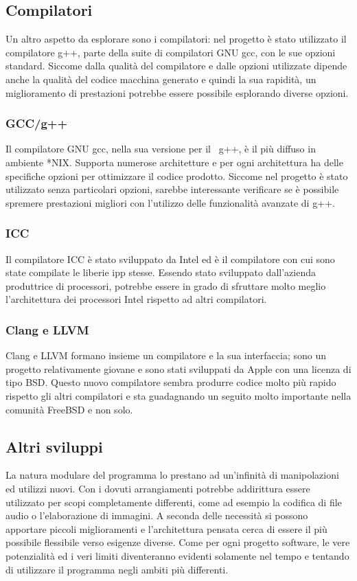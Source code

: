 \subsection{Compilatori}
Un altro aspetto da esplorare sono i compilatori: nel progetto \`e stato
utilizzato il compilatore g++, parte della suite di compilatori GNU gcc, con le
sue opzioni standard. Siccome dalla qualit\`a del compilatore e dalle opzioni
utilizzate dipende anche la qualit\`a del codice macchina generato e quindi la
sua rapidit\`a, un miglioramento di prestazioni potrebbe essere possibile
esplorando diverse opzioni.

\subsubsection{GCC/g++}
Il compilatore GNU gcc, nella sua versione per il \CC\, g++, \`e il pi\`u
diffuso in ambiente *NIX. Supporta numerose architetture e per ogni architettura
ha delle specifiche opzioni per ottimizzare il codice prodotto. Siccome nel
progetto \`e stato utilizzato senza particolari opzioni, sarebbe interessante
verificare se \`e possibile spremere prestazioni migliori con l'utilizzo delle
funzionalit\`a avanzate di g++.

\subsubsection{ICC}
Il compilatore ICC \`e stato sviluppato da Intel ed \`e il compilatore con cui
sono state compilate le liberie \ac{ipp} stesse. Essendo stato sviluppato
dall'azienda produttrice di processori, potrebbe essere in grado di sfruttare
molto meglio l'architettura dei processori Intel rispetto ad altri compilatori.

\subsubsection{Clang e LLVM}
Clang e LLVM formano insieme un compilatore e la sua interfaccia; sono un
progetto relativamente giovane e sono stati sviluppati da Apple con una licenza
di tipo BSD. Questo nuovo compilatore sembra produrre codice molto più rapido
rispetto gli altri compilatori e sta guadagnando un seguito molto importante
nella comunit\`a FreeBSD e non solo.

\subsection{Altri sviluppi}
La natura modulare del programma lo prestano ad un'infinit\`a di manipolazioni
ed utilizzi nuovi. Con i dovuti arrangiamenti potrebbe addirittura essere
utilizzato per scopi completamente differenti, come ad esempio la codifica di
file audio o l'elaborazione di immagini. A seconda delle necessit\`a si possono
apportare piccoli miglioramenti e l'architettura pensata cerca di essere il
pi\`u possibile flessibile verso esigenze diverse. Come per ogni progetto
software, le vere potenzialit\`a ed i veri limiti diventeranno evidenti
solamente nel tempo e tentando di utilizzare il programma negli ambiti pi\`u
differenti.
